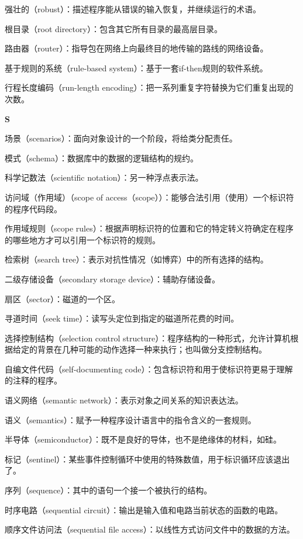 强壮的（robust）：描述程序能从错误的输入恢复，并继续运行的术语。

根目录（root directory）：包含其它所有目录的最高层目录。

路由器（router）：指导包在网络上向最终目的地传输的路线的网络设备。

基于规则的系统（rule-based system）：基于一套if-then规则的软件系统。

行程长度编码（run-length encoding）：把一系列重复字符替换为它们重复出现的次数。

\textbf{S}

场景（scenarios）：面向对象设计的一个阶段，将给类分配责任。

模式（schema）：数据库中的数据的逻辑结构的规约。

科学记数法（scientific notation）：另一种浮点表示法。

访问域（作用域）（scope of access（scope））：能够合法引用（使用）一个标识符的程序代码段。

作用域规则（scope rules）：根据声明标识符的位置和它的特定转义符确定在程序的哪些地方才可以引用一个标识符的规则。

检索树（search tree）：表示对抗性情况（如博弈）中的所有选择的结构。

二级存储设备（secondary storage device）：辅助存储设备。

扇区（sector）：磁道的一个区。

寻道时间（seek time）：读写头定位到指定的磁道所花费的时间。

选择控制结构（selection control structure）：程序结构的一种形式，允许计算机根据给定的背景在几种可能的动作选择一种来执行；也叫做分支控制结构。

自编文件代码（self-documenting code）：包含标识符和用于使标识符更易于理解的注释的程序。

语义网络（semantic network）：表示对象之间关系的知识表达法。

语义（semantics）：赋予一种程序设计语言中的指令含义的一套规则。

半导体（semiconductor）：既不是良好的导体，也不是绝缘体的材料，如硅。

标记（sentinel）：某些事件控制循环中使用的特殊数值，用于标识循环应该退出了。

序列（sequence）：其中的语句一个接一个被执行的结构。

时序电路（sequential circuit）：输出是输入值和电路当前状态的函数的电路。

顺序文件访问法（sequential file access）：以线性方式访问文件中的数据的方法。

